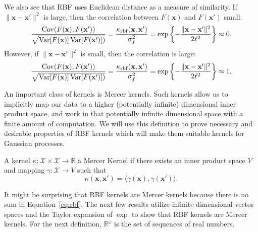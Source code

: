 We also see that RBF uses Euclidean distance as a measure of similarity.
If $\lVert \mathbf{x} - \mathbf{x}' \rVert^2$ is large, then the correlation between $F(\mathbf{x})$ and $F(\mathbf{x}')$ small:
\begin{equation*}
    \frac{\operatorname{Cov}(F(\mathbf{x}), F(\mathbf{x}'))}{\sqrt{\operatorname{Var}[F(\mathbf{x})]\operatorname{Var}[F(\mathbf{x}')])}} = \frac{\kappa_{\mathrm{rbf}}(\mathbf{x}, \mathbf{x}')}{\sigma_f^2} = \exp \left\{ -\frac{ \lVert \mathbf{x} - \mathbf{x}' \rVert^2 }{ 2\ell^2 } \right\} \approx 0.
\end{equation*}
However, if $\lVert \mathbf{x} - \mathbf{x}' \rVert^2$ is small, then the correlation is large:
\begin{equation*}
    \frac{\operatorname{Cov}(F(\mathbf{x}), F(\mathbf{x}'))}{\sqrt{\operatorname{Var}[F(\mathbf{x})]\operatorname{Var}[F(\mathbf{x}')])}}
    = \frac{\kappa_{\mathrm{rbf}}(\mathbf{x}, \mathbf{x}')}{\sigma_f^2} = \exp \left\{ -\frac{ \lVert \mathbf{x} - \mathbf{x}' \rVert^2 }{ 2\ell^2 } \right\} \approx 1.
\end{equation*}

An important class of kernels is Mercer kernels.
Such kernels allow us to implicitly map our data to a higher (potentially infinite) dimensional inner product space, and work in that potentially infinite dimensional space with a finite amount of computation.
We will use this definition to prove necessary and desirable properties of RBF kernels which will make them suitable kernels for Gaussian processes.

\begin{definition}
    A kernel $\kappa: \mathcal{X} \times \mathcal{X} \to \mathbb{R}$
    a Mercer Kernel if there exists an inner product space
    $V$ and mapping $\gamma : \mathcal{X} \to V$ such that
    \begin{equation*}
        \kappa(\mathbf{x}, \mathbf{x}') = \langle \gamma(\mathbf{x}), \gamma(\mathbf{x}') \rangle.
    \end{equation*}
\end{definition}

It might be surprising that RBF kernels are Mercer kernels because there is no sum in Equation~\ref{eq:rbf}.
The next few results utilize infinite dimensional vector spaces and the Taylor expansion of $\exp$ to show that RBF kernels are Mercer kernels.
For the next definition, $\mathbb{R}^{\omega}$ is the set of sequences of real numbers.

